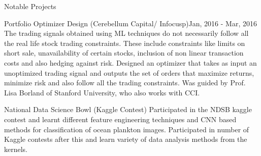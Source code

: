 \documentclass{resume} %
\begin{document}
\begin{rSection}{Notable Projects}
	
	
	
	
		\begin{rSubsection}{Portfolio Optimizer Design  (Cerebellum Capital/ Infocusp)}{Jan, 2016 - Mar, 2016}{}{}	{}
		The trading signals obtained using ML techniques do not necessarily follow all the real life stock trading constraints. These include constraints like limits on short sale, unavailability of certain stocks, inclusion of non linear transaction costs and also hedging against risk. Designed an optimizer that takes as input an unoptimized trading signal and outputs the set of orders that maximize returns, minimize risk and also follow all the trading constraints. Was guided by Prof. Lisa Borland of Stanford University, who also works with CCI.
		\end{rSubsection}
		\vspace{0.1 in}
		
	\begin{rSubsection}{National Data Science Bowl (Kaggle Contest)}{}{}{}	{}
	Participated in the NDSB kaggle contest and learnt different feature engineering techniques and CNN based methods for classification of ocean plankton images. Participated in number of Kaggle contests after this and learn variety of data analysis methods from the kernels.
	\end{rSubsection}
	
	\vspace{0.1 in}
	\end{rSection}
	
\end{document}

